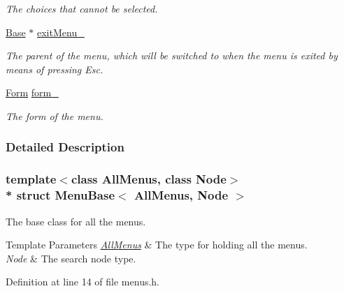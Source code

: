 \begin{DoxyCompactItemize}
\begin{DoxyCompactList}\small\item\em The choices that cannot be selected. \end{DoxyCompactList}\item 
\hyperlink{structMenuBase_a65fa140b1b2ea26bb4de5473b75a502e}{Base} $\ast$ \hyperlink{structMenuBase_aa000fd37f32a606446854ffb96a84d6f}{exit\+Menu\+\_\+}\hypertarget{structMenuBase_aa000fd37f32a606446854ffb96a84d6f}{}\label{structMenuBase_aa000fd37f32a606446854ffb96a84d6f}

\begin{DoxyCompactList}\small\item\em The parent of the menu, which will be switched to when the menu is exited by means of pressing Esc. \end{DoxyCompactList}\item 
\hyperlink{structForm}{Form} \hyperlink{structMenuBase_a1fb337bdaf00ad3f4e7edd09ade1f7ef}{form\+\_\+}\hypertarget{structMenuBase_a1fb337bdaf00ad3f4e7edd09ade1f7ef}{}\label{structMenuBase_a1fb337bdaf00ad3f4e7edd09ade1f7ef}

\begin{DoxyCompactList}\small\item\em The form of the menu. \end{DoxyCompactList}\end{DoxyCompactItemize}


\subsubsection{Detailed Description}
\subsubsection*{template$<$class All\+Menus, class Node$>$\\*
struct Menu\+Base$<$ All\+Menus, Node $>$}

The base class for all the menus. 


\begin{DoxyTemplParams}{Template Parameters}
{\em \hyperlink{structAllMenus}{All\+Menus}} & The type for holding all the menus. \\
\hline
{\em Node} & The search node type. \\
\hline
\end{DoxyTemplParams}


Definition at line 14 of file menus.\+h.



